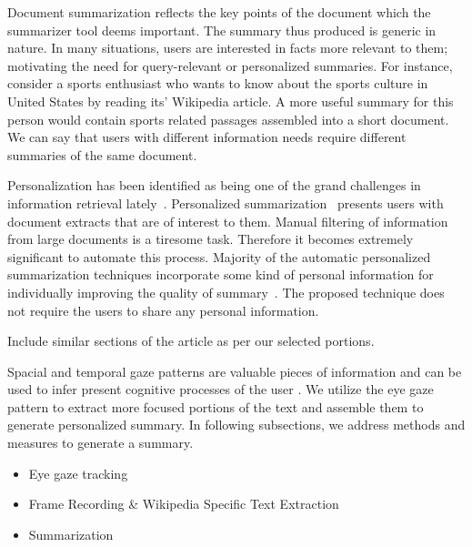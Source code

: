 \documentclass[12pt]{article}
\begin{document}
Document summarization reflects the key points of the document which the summarizer tool deems important. The summary thus produced is generic in nature. In many situations, users are interested in facts more relevant to them; motivating the need for query-relevant or personalized summaries. For instance, consider a sports enthusiast who wants to know about the sports culture in United States by reading its' Wikipedia article. A more useful summary for this person would contain sports related passages assembled into a short document. We can say that users with different information needs require different summaries of the same document.

Personalization has been identified as being one of the grand challenges in information retrieval lately~\cite{belkin2008some}. Personalized summarization~\cite{berkovsky2008aspect} presents users with document extracts that are of interest to them. Manual filtering of information from large documents is a tiresome task. Therefore it becomes extremely significant to automate this process. Majority of the automatic personalized summarization techniques incorporate some kind of personal information for individually improving the quality of summary~\cite{moro2012personalized, wu2008personalized, kumar2008generating}. The proposed technique does not require the users to share any personal information. 

Include similar sections of the article as per our selected portions.


Spacial and temporal gaze patterns are valuable pieces of information and can be used to infer present cognitive processes of the user \cite{Beymer:2005:WSC:1056808.1057055}. We utilize the eye gaze pattern to extract more focused portions of the text and assemble them to generate personalized summary. In following subsections, we address methods and measures to generate a summary.



\begin{itemize}
\item Eye gaze tracking
\item Frame Recording \& Wikipedia Specific Text Extraction
\item Summarization
\end{itemize}
\end{document}
